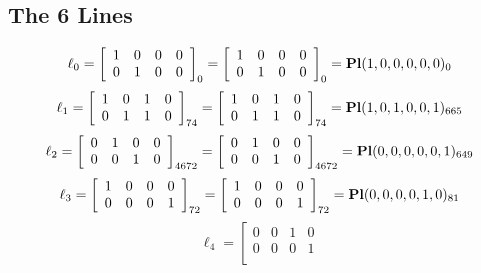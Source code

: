 \documentclass{article}
\begin{document}
{\subsection*{The 6 Lines}
$$
\ell_{0} = 
\left[
\begin{array}{*{4}{r}}
1 & 0 & 0 & 0\\
0 & 1 & 0 & 0\\
\end{array}
\right]
_{0}
=
\left[
\begin{array}{*{4}c}
1  & 0  & 0  & 0\\
0  & 1  & 0  & 0\\
\end{array}
\right]_{0}
={\rm\bf Pl}(1,0,0,0,0,0 )_{0}$$
$$
\ell_{1} = 
\left[
\begin{array}{*{4}{r}}
1 & 0 & 1 & 0\\
0 & 1 & 1 & 0\\
\end{array}
\right]
_{74}
=
\left[
\begin{array}{*{4}c}
1  & 0  & 1  & 0\\
0  & 1  & 1  & 0\\
\end{array}
\right]_{74}
={\rm\bf Pl}(1,0,1,0,0,1 )_{665}$$
$$
\ell_{2} = 
\left[
\begin{array}{*{4}{r}}
0 & 1 & 0 & 0\\
0 & 0 & 1 & 0\\
\end{array}
\right]
_{4672}
=
\left[
\begin{array}{*{4}c}
0  & 1  & 0  & 0\\
0  & 0  & 1  & 0\\
\end{array}
\right]_{4672}
={\rm\bf Pl}(0,0,0,0,0,1 )_{649}$$
$$
\ell_{3} = 
\left[
\begin{array}{*{4}{r}}
1 & 0 & 0 & 0\\
0 & 0 & 0 & 1\\
\end{array}
\right]
_{72}
=
\left[
\begin{array}{*{4}c}
1  & 0  & 0  & 0\\
0  & 0  & 0  & 1\\
\end{array}
\right]_{72}
={\rm\bf Pl}(0,0,0,0,1,0 )_{81}$$
$$
\ell_{4} = 
\left[
\begin{array}{*{4}{r}}
0 & 0 & 1 & 0\\
0 & 0 & 0 & 1\\
\end{array}
$$}
\end{document}
